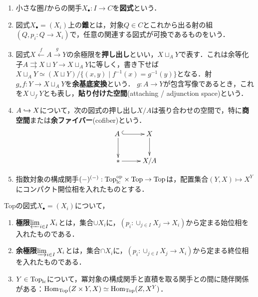 \documentclass[uplatex,dvipdfmx]{jsreport}
\begin{document}
\begin{notation}[標準的構成]\mbox{}
    \begin{enumerate}
        \item 小さな圏$I$からの関手$X_\bullet:I\to C$を\textbf{図式}という．
        \item 図式$X_\bullet=(X_i)$上の\textbf{錐}とは，対象$Q\in C$とこれから出る射の組$(Q,p_i:Q\to X_i)$で，任意の関連する図式が可換であるものをいう．
        \item 図式$X\xleftarrow{f}A\xrightarrow{g}Y$の余極限を\textbf{押し出し}といい，$X\sqcup_AY$で表す．これは余等化子$A\rightrightarrows X\sqcup Y\to X\sqcup_AY$に等しく，書き下せば$X\sqcup_AY\simeq(X\sqcup Y)/\{(x,y)\mid f^{-1}(x)=g^{-1}(y)\}$となる．射$g_*f:Y\to X\sqcup_AY$を\textbf{余基底変換}という．
        $g:A\to Y$が包含写像であるとき，これを$X\cup_fY$とも表し，\textbf{貼り付けた空間}(attaching / adjunction space)という．
        \item $A\hookrightarrow X$について，次の図式の押し出し$X/A$は張り合わせの空間で，特に\textbf{商空間}または\textbf{余ファイバー}(cofiber)という．
        \[\xymatrix{
            A \;\ar@{^{(}->}[r]\ar[d]&X\ar[d]\\
            {*}\ar[r]&X/A
        }\]
        \item 指数対象の構成関手$(-)^{(-)}:\mathrm{Top}^{\mathrm{op}}_{\mathrm{lc}}\times\mathrm{Top}\to\mathrm{Top}$は，配置集合$(Y,X)\mapsto X^Y$にコンパクト開位相を入れたものとする．
    \end{enumerate}
\end{notation}

\begin{proposition}
    Topの図式$X_\bullet=(X_i)$について，
    \begin{enumerate}
        \item \textbf{極限}$\varprojlim_{i\in I}X_i$とは，集合$\cup X_i$に，$(p_i:\cup_{j\in I}X_j\to X_i)$から定まる始位相を入れたものである．
        \item \textbf{余極限}$\varinjlim_{i\in I}X_i$とは，集合$\cap X_i$に，$(p_i:\cup_{j\in I}X_j\to X_i)$から定まる終位相を入れたものである．
        \item $Y\in\mathrm{Top}_{\mathrm{lc}}$について，冪対象の構成関手と直積を取る関手との間に随伴関係がある：$\mathrm{Hom}_{\mathrm{Top}}(Z\times Y,X)\simeq\mathrm{Hom}_{\mathrm{Top}}(Z,X^Y)$．
    \end{enumerate}
\end{proposition}
\end{document}
